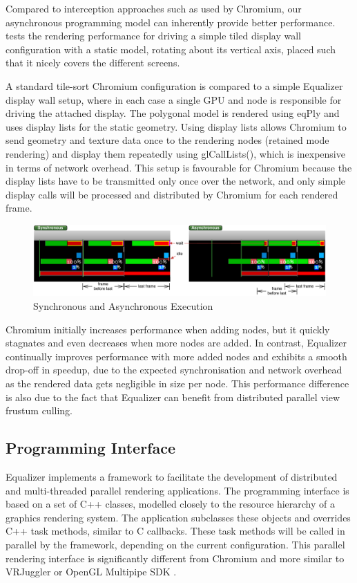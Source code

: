 Compared to interception approaches such as used by Chromium, our asynchronous
programming model can inherently provide better performance.  tests
the rendering performance for driving a simple tiled display wall configuration
with a static model, rotating about its vertical axis, placed such that it
nicely covers the different screens.

A standard tile-sort Chromium configuration is compared to a simple Equalizer
display wall setup, where in each case a single GPU and node is responsible for
driving the attached display. The polygonal model is rendered using eqPly and
uses display lists for the static geometry. Using display lists allows Chromium
to send geometry and texture data once to the rendering nodes (retained mode
rendering) and display them repeatedly using \textsf{glCallLists()}, which is
inexpensive in terms of network overhead. This setup is favourable for Chromium
because the display lists have to be transmitted only once over the network,
and only simple display calls will be processed and distributed by Chromium for
each rendered frame.

\begin{figure}[h!t]\center
 \includegraphics[width=\textwidth]{images/syncAsync}
 {\caption{\label{fSyncAsync}Synchronous and Asynchronous Execution}}
\end{figure}

Chromium initially increases performance when adding nodes, but it quickly
stagnates and even decreases when more nodes are added. In contrast, Equalizer
continually improves performance with more added nodes and exhibits a smooth
drop-off in speedup, due to the expected synchronisation and network overhead
as the rendered data gets negligible in size per node. This performance
difference is also due to the fact that Equalizer can benefit from distributed
parallel view frustum culling.


\subsection{Programming Interface}

Equalizer implements a framework to facilitate the development of distributed and
multi-threaded parallel rendering applications. The programming interface is
based on a set of C++ classes, modelled closely to the resource hierarchy of a
graphics rendering system. The application subclasses these objects and
overrides C++ task methods, similar to C callbacks. These task methods will be
called in parallel by the framework, depending on the current configuration.
This parallel rendering interface is significantly different from Chromium
\cite{HHNFAKK:02} and more similar to VRJuggler \cite{BJHMBC:01} or OpenGL
Multipipe SDK \cite{BRE:05}.

